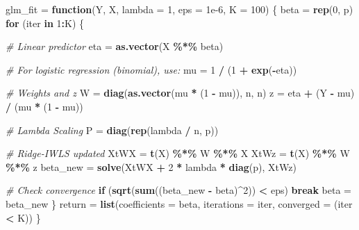 \documentclass[12pt,halfline,a4paper,]{ouparticle}
\newenvironment{Shaded}{\begin{snugshade}}{\end{snugshade}}
\newcommand{\AttributeTok}[1]{\textcolor[rgb]{0.13,0.29,0.53}{#1}}
\newcommand{\CommentTok}[1]{\textcolor[rgb]{0.56,0.35,0.01}{\textit{#1}}}
\newcommand{\ControlFlowTok}[1]{\textcolor[rgb]{0.13,0.29,0.53}{\textbf{#1}}}
\newcommand{\DecValTok}[1]{\textcolor[rgb]{0.00,0.00,0.81}{#1}}
\newcommand{\FloatTok}[1]{\textcolor[rgb]{0.00,0.00,0.81}{#1}}
\newcommand{\FunctionTok}[1]{\textcolor[rgb]{0.13,0.29,0.53}{\textbf{#1}}}
\newcommand{\NormalTok}[1]{#1}
\newcommand{\OtherTok}[1]{\textcolor[rgb]{0.56,0.35,0.01}{#1}}
\newcommand{\SpecialCharTok}[1]{\textcolor[rgb]{0.81,0.36,0.00}{\textbf{#1}}}
\begin{document}
\begin{Shaded}
\begin{Highlighting}[]
\NormalTok{glm\_fit }\OtherTok{=} \ControlFlowTok{function}\NormalTok{(Y, X, }\AttributeTok{lambda =} \DecValTok{1}\NormalTok{, }\AttributeTok{eps =} \FloatTok{1e{-}6}\NormalTok{, }\AttributeTok{K =} \DecValTok{100}\NormalTok{) \{}
\NormalTok{  beta }\OtherTok{=} \FunctionTok{rep}\NormalTok{(}\DecValTok{0}\NormalTok{, p)}
  \ControlFlowTok{for}\NormalTok{ (iter }\ControlFlowTok{in} \DecValTok{1}\SpecialCharTok{:}\NormalTok{K) \{}
    
    \CommentTok{\# Linear predictor}
\NormalTok{    eta }\OtherTok{=} \FunctionTok{as.vector}\NormalTok{(X }\SpecialCharTok{\%*\%}\NormalTok{ beta)}
    
    \CommentTok{\# For logistic regression (binomial), use:}
\NormalTok{    mu }\OtherTok{=} \DecValTok{1} \SpecialCharTok{/}\NormalTok{ (}\DecValTok{1} \SpecialCharTok{+} \FunctionTok{exp}\NormalTok{(}\SpecialCharTok{{-}}\NormalTok{eta))}
    
    \CommentTok{\# Weights and z}
\NormalTok{    W }\OtherTok{=} \FunctionTok{diag}\NormalTok{(}\FunctionTok{as.vector}\NormalTok{(mu }\SpecialCharTok{*}\NormalTok{ (}\DecValTok{1} \SpecialCharTok{{-}}\NormalTok{ mu)), n, n)}
\NormalTok{    z }\OtherTok{=}\NormalTok{ eta }\SpecialCharTok{+}\NormalTok{ (Y }\SpecialCharTok{{-}}\NormalTok{ mu) }\SpecialCharTok{/}\NormalTok{ (mu }\SpecialCharTok{*}\NormalTok{ (}\DecValTok{1} \SpecialCharTok{{-}}\NormalTok{ mu))}
    
    \CommentTok{\# Lambda Scaling}
\NormalTok{    P }\OtherTok{=} \FunctionTok{diag}\NormalTok{(}\FunctionTok{rep}\NormalTok{(lambda }\SpecialCharTok{/}\NormalTok{ n, p))}
    
    \CommentTok{\# Ridge{-}IWLS updated}
\NormalTok{    XtWX }\OtherTok{=} \FunctionTok{t}\NormalTok{(X) }\SpecialCharTok{\%*\%}\NormalTok{ W }\SpecialCharTok{\%*\%}\NormalTok{ X}
\NormalTok{    XtWz }\OtherTok{=} \FunctionTok{t}\NormalTok{(X) }\SpecialCharTok{\%*\%}\NormalTok{ W }\SpecialCharTok{\%*\%}\NormalTok{ z}
\NormalTok{    beta\_new }\OtherTok{=} \FunctionTok{solve}\NormalTok{(XtWX }\SpecialCharTok{+} \DecValTok{2} \SpecialCharTok{*}\NormalTok{ lambda }\SpecialCharTok{*} \FunctionTok{diag}\NormalTok{(p), XtWz)}
    
    \CommentTok{\# Check convergence}
    \ControlFlowTok{if}\NormalTok{ (}\FunctionTok{sqrt}\NormalTok{(}\FunctionTok{sum}\NormalTok{((beta\_new }\SpecialCharTok{{-}}\NormalTok{ beta)}\SpecialCharTok{\^{}}\DecValTok{2}\NormalTok{)) }\SpecialCharTok{\textless{}}\NormalTok{ eps) }\ControlFlowTok{break}
\NormalTok{    beta }\OtherTok{=}\NormalTok{ beta\_new}
\NormalTok{  \}}
\NormalTok{  return }\OtherTok{=} \FunctionTok{list}\NormalTok{(}\AttributeTok{coefficients =}\NormalTok{ beta, }\AttributeTok{iterations =}\NormalTok{ iter, }\AttributeTok{converged =}\NormalTok{ (iter }\SpecialCharTok{\textless{}}\NormalTok{ K))}
\NormalTok{\}}
\end{Highlighting}
\end{Shaded}
\end{document}
